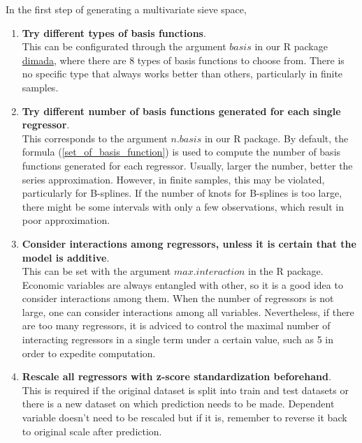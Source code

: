 \documentclass[12pt, a4paper]{article}
\theoremstyle{MAstyle} \newtheorem{assumption}{Assumption}[section]
\theoremstyle{MAstyle} \newtheorem{definition}{Definition}[section]
\theoremstyle{MAstyle} \newtheorem{theorem}{Theorem}[section]
\theoremstyle{MAstyle} \newtheorem{corollary}{Corollary}[section]
\begin{document}
            In the first step of generating a multivariate sieve space,
            \begin{enumerate}[label=\textbf{(\alph*)}, noitemsep]
                \item \textbf{Try different types of basis functions}. \\
                This can be configurated through the argument $basis$ in our R package \href{https://github.com/ccfang2/dimada}{dimada}, where there are 8 types of basis functions to choose from. There is no specific type that always works better than others, particularly in finite samples.  
                \item \textbf{Try different number of basis functions generated for each single regressor}.\\
                This corresponds to the argument $n.basis$ in our R package. By default, the formula (\ref{set_of_basis_function}) is used to compute the number of basis functions generated for each regressor. Usually, larger the number, better the series approximation. However, in finite samples, this may be violated, particularly for B-splines. If the number of knots for B-splines is too large, there might be some intervals with only a few observations, which result in poor approximation.
                \item \textbf{Consider interactions among regressors, unless it is certain that the model is additive}.\\
                This can be set with the argument $max.interaction$ in the R package. Economic variables are always entangled with other, so it is a good idea to consider interactions among them. When the number of regressors is not large, one can consider interactions among all variables. Nevertheless, if there are too many regressors, it is adviced to control the maximal number of interacting regressors in a single term under a certain value, such as 5 in order to expedite computation. 
                \item \textbf{Rescale all regressors with z-score standardization beforehand}.\\
                This is required if the original dataset is split into train and test datasets or there is a new dataset on which prediction needs to be made. Dependent variable doesn't need to be rescaled but if it is, remember to reverse it back to original scale after prediction.
            \end{enumerate}
\end{document}
